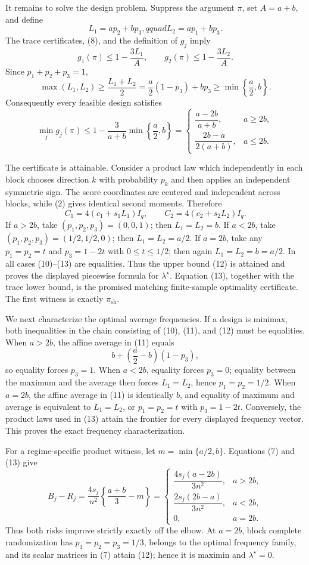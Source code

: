 It remains to solve the design problem. Suppress the argument \(\pi\), set \(A=a+b\), and define
\[
L_1=ap_2+bp_3,qquad L_2=ap_1+bp_3. \tag{9}
\]
The trace certificates, (8), and the definition of \(g_j\) imply
\[
g_1(\pi)\le1-\frac{3L_1}{A},
\qquad
g_2(\pi)\le1-\frac{3L_2}{A}. \tag{10}
\]
Since \(p_1+p_2+p_3=1\),
\[
\max(L_1,L_2)
\ge\frac{L_1+L_2}{2}
=\frac a2(1-p_3)+bp_3
\ge\min\left\{\frac a2,b\right\}. \tag{11}
\]
Consequently every feasible design satisfies
\[
\min_j g_j(\pi)
\le1-\frac{3}{a+b}\min\left\{\frac a2,b\right\}
=
\begin{cases}
\dfrac{a-2b}{a+b},&a\ge2b,\\[6pt]
\dfrac{2b-a}{2(a+b)},&a\le2b.
\end{cases} \tag{12}
\]

The certificate is attainable. Consider a product law which independently in each block chooses direction \(k\) with probability \(p_k\) and then applies an independent symmetric sign. The score coordinates are centered and independent across blocks, while (2) gives identical second moments. Therefore
\[
C_1=4(c_1+s_1L_1)I_q,
\qquad
C_2=4(c_2+s_2L_2)I_q. \tag{13}
\]
If \(a>2b\), take \((p_1,p_2,p_3)=(0,0,1)\); then \(L_1=L_2=b\). If \(a<2b\), take \((p_1,p_2,p_3)=(1/2,1/2,0)\); then \(L_1=L_2=a/2\). If \(a=2b\), take any \(p_1=p_2=t\) and \(p_3=1-2t\) with \(0\le t\le1/2\); then again \(L_1=L_2=b=a/2\). In all cases (10)--(13) are equalities. Thus the upper bound (12) is attained and proves the displayed piecewise formula for \(\lambda^\star\). Equation (13), together with the trace lower bound, is the promised matching finite-sample optimality certificate. The first witness is exactly \(\pi_{\mathrm{sh}}\).

We next characterize the optimal average frequencies. If a design is minimax, both inequalities in the chain consisting of (10), (11), and (12) must be equalities. When \(a>2b\), the affine average in (11) equals
\[
b+\left(\frac a2-b\right)(1-p_3),
\]
so equality forces \(p_3=1\). When \(a<2b\), equality forces \(p_3=0\); equality between the maximum and the average then forces \(L_1=L_2\), hence \(p_1=p_2=1/2\). When \(a=2b\), the affine average in (11) is identically \(b\), and equality of maximum and average is equivalent to \(L_1=L_2\), or \(p_1=p_2=t\) with \(p_3=1-2t\). Conversely, the product laws used in (13) attain the frontier for every displayed frequency vector. This proves the exact frequency characterization.

For a regime-specific product witness, let \(m=\min\{a/2,b\}\). Equations (7) and (13) give
\[
B_j-R_j
=\frac{4s_j}{n^2}\left\{\frac{a+b}{3}-m\right\}
=
\begin{cases}
\dfrac{4s_j(a-2b)}{3n^2},&a>2b,\\[6pt]
\dfrac{2s_j(2b-a)}{3n^2},&a<2b,\\[6pt]
0,&a=2b.
\end{cases} \tag{14}
\]
Thus both risks improve strictly exactly off the elbow. At \(a=2b\), block complete randomization has \(p_1=p_2=p_3=1/3\), belongs to the optimal frequency family, and its scalar matrices in (7) attain (12); hence it is maximin and \(\lambda^\star=0\).

